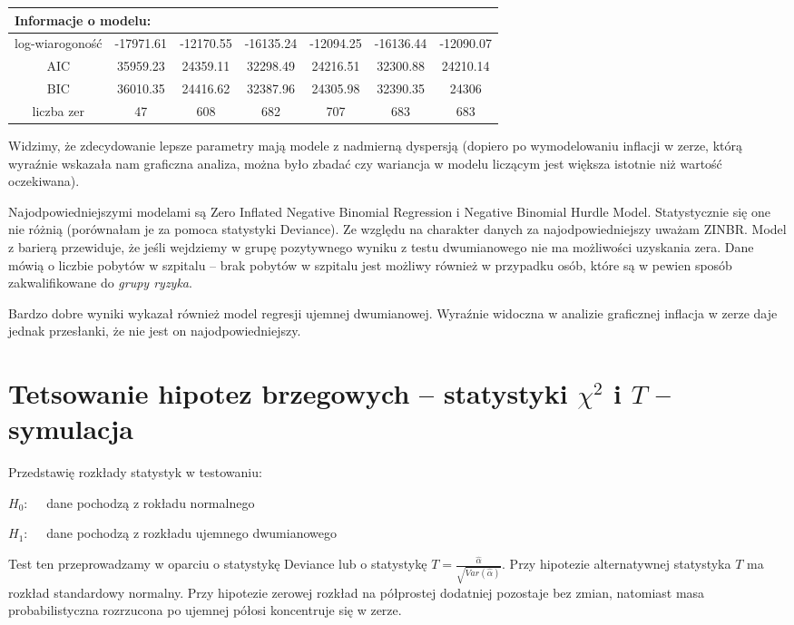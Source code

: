 \documentclass[a4paper,11pt]{article}
\begin{document}
\begin{tabular}{|c|c|c|c|c|c|c|}
\multicolumn{7}{|l|}{Informacje o modelu: } \\ \hline
log-wiarogoność &  -17971.61 &  -12170.55 &  -16135.24 &  -12094.25  & -16136.44   & -12090.07  \\
AIC & 35959.23 & 24359.11 & 32298.49 & 24216.51  & 32300.88  & 24210.14 \\
BIC & 36010.35 & 24416.62 & 32387.96   & 24305.98   &   32390.35   &  24306    \\
liczba zer & 47 & 608 & 682  &  707   &  683   &  683   \\ \hline 

\end{tabular}

\linebreak

Widzimy, że zdecydowanie lepsze parametry mają modele z nadmierną dyspersją (dopiero po wymodelowaniu inflacji w zerze, którą wyraźnie wskazała nam graficzna analiza, można było zbadać czy wariancja w modelu liczącym jest większa istotnie niż wartość oczekiwana). 

Najodpowiedniejszymi modelami są Zero  Inflated Negative Binomial Regression i Negative Binomial Hurdle  Model. Statystycznie się one nie różnią (porównałam je za pomoca statystyki Deviance). Ze względu na charakter danych za najodpowiedniejszy uważam ZINBR. Model z barierą przewiduje, że jeśli wejdziemy w grupę pozytywnego wyniku z testu dwumianowego nie ma możliwości uzyskania zera. Dane mówią o liczbie pobytów  w szpitalu -- brak  pobytów w szpitalu jest możliwy również w przypadku osób, które są w pewien sposób zakwalifikowane do \textit{grupy  ryzyka}.

Bardzo dobre wyniki wykazał również model regresji ujemnej dwumianowej. Wyraźnie widoczna w analizie graficznej inflacja w zerze daje jednak przesłanki, że nie jest on najodpowiedniejszy. 

\pagebreak

\section{Tetsowanie hipotez brzegowych -- statystyki $\chi^{2}$ i $T$ -- symulacja}

Przedstawię rozkłady statystyk w testowaniu:

$H_{0}: \quad $ dane pochodzą z rokładu normalnego

$H_{1}: \quad$ dane pochodzą z rozkładu ujemnego dwumianowego

Test ten przeprowadzamy w oparciu o statystykę Deviance lub o statystykę $T = \frac{\widehat{\alpha}}{\sqrt{Var(\widehat{\alpha})}}$. Przy hipotezie alternatywnej statystyka $T$ ma rozkład standardowy normalny. Przy hipotezie zerowej rozkład na półprostej dodatniej pozostaje bez zmian, natomiast masa probabilistyczna rozrzucona po ujemnej półosi koncentruje się w zerze. 
\end{document}
